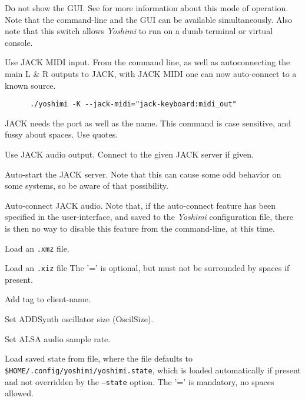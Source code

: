       Do not show the GUI.  See  for more
      information about this mode of operation.  Note that the command-line
      and the GUI can be available simultaneously.  Also note that this
      switch allows \textsl{Yoshimi} to run on a dumb terminal or virtual
      console.

      Use JACK MIDI input.
      From the command line, as well as autoconnecting the main L \& R
      outputs to JACK, with JACK MIDI one can now auto-connect to a known source.

   \begin{verbatim}
      ./yoshimi -K --jack-midi="jack-keyboard:midi_out"
   \end{verbatim}
   
   JACK needs the port as well as the name.
   This command is case sensitive, and fussy about spaces.
   Use quotes.

      Use JACK audio output.
      Connect to the given JACK server if given.

      Auto-start the JACK server.
      Note that this can cause some odd behavior on some systems, so be aware of
      that possibility.

      Auto-connect JACK audio.  Note that, if the auto-connect feature has been
      specified in the user-interface, and saved to the \textsl{Yoshimi}
      configuration file, there is then no way to disable this feature from the
      command-line, at this time.

      Load an \texttt{.xmz} file.

      Load an \texttt{.xiz} file  The '=' is optional, but must not be
      surrounded by spaces if present.

      Add tag to client-name.

      Set ADDSynth oscillator size (OscilSize).

      Set ALSA audio sample rate.

      Load saved state from file, where the file defaults to
      \texttt{\$HOME/.config/yoshimi/yoshimi.state}, which is loaded
      automatically if present and not overridden by the \texttt{--state}
      option. The '=' is mandatory, no spaces allowed.

